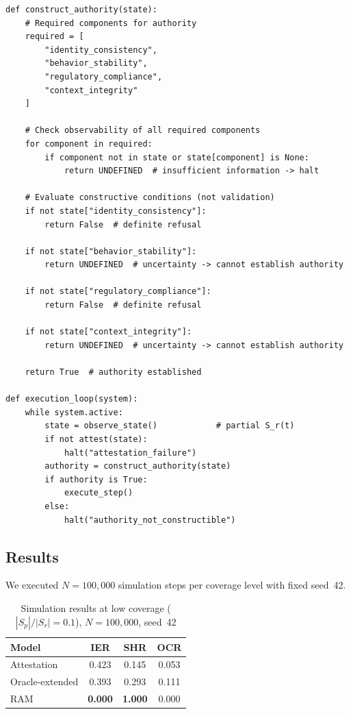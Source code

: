 \documentclass[11pt]{article}
\newcommand{\Sr}{S_r}
\newcommand{\Sp}{S_p}
\begin{document}
\begin{lstlisting}[caption={RAM authority construction function},
                   label={lst:ram}]
def construct_authority(state):
    # Required components for authority
    required = [
        "identity_consistency",
        "behavior_stability",
        "regulatory_compliance",
        "context_integrity"
    ]

    # Check observability of all required components
    for component in required:
        if component not in state or state[component] is None:
            return UNDEFINED  # insufficient information -> halt

    # Evaluate constructive conditions (not validation)
    if not state["identity_consistency"]:
        return False  # definite refusal

    if not state["behavior_stability"]:
        return UNDEFINED  # uncertainty -> cannot establish authority

    if not state["regulatory_compliance"]:
        return False  # definite refusal

    if not state["context_integrity"]:
        return UNDEFINED  # uncertainty -> cannot establish authority

    return True  # authority established

def execution_loop(system):
    while system.active:
        state = observe_state()            # partial S_r(t)
        if not attest(state):
            halt("attestation_failure")
        authority = construct_authority(state)
        if authority is True:
            execute_step()
        else:
            halt("authority_not_constructible")
\end{lstlisting}

\subsection{Results}

We executed $N=100{,}000$ simulation steps per coverage level with fixed seed~42.

\begin{table}[H]
\centering
\caption{Simulation results at low coverage ($|\Sp|/|\Sr|=0.1$), $N=100{,}000$, seed~42}
\label{tab:results-baseline}
\begin{tabular}{lccc}
\toprule
\textbf{Model} & \textbf{IER} & \textbf{SHR} & \textbf{OCR} \\
\midrule
Attestation        & 0.423 & 0.145 & 0.053 \\
Oracle-extended    & 0.393 & 0.293 & 0.111 \\
RAM                & \textbf{0.000} & \textbf{1.000} & 0.000 \\
\bottomrule
\end{tabular}
\end{table}
\end{document}
